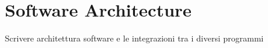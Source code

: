 \chapter{Software Architecture}
\label{chap:fourth}
\ifpdf
    \graphicspath{{Chapter4/Figures/PNG/}{Chapter4/Figures/PDF/}{Chapter4/Figures/}{Chapter4/Figures/EPS/}}
\else
    \graphicspath{{Chapter4/Figures/EPS/}{Chapter4/Figures/}}
\fi

Scrivere architettura software e le integrazioni tra i diversi programmi